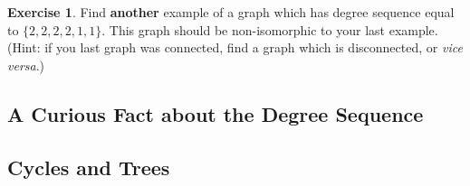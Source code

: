 \documentclass[12pt,letterpaper]{article}
\theoremstyle{definition}
\newtheorem{exercise}[question]{Exercise}
\begin{document}
\begin{exercise}
Find \textbf{another} example of a graph which has degree sequence equal to $\{2,2,2,2,1,1\}$. This graph should
be non-isomorphic to your last example. (Hint: if you last graph was connected, find a graph which is disconnected, 
or \textit{vice versa}.)
\end{exercise}

\subsection*{A Curious Fact about the Degree Sequence}



\subsection*{Cycles and Trees}



\end{document}
